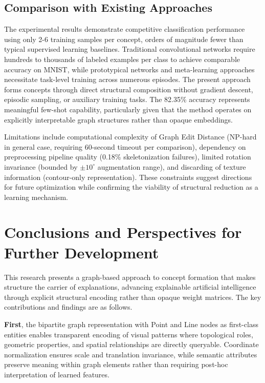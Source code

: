 \documentclass[a4paper,10pt]{article}
\begin{document}
\subsection{Comparison with Existing Approaches}

The experimental results demonstrate competitive classification performance using only 2-6 training samples per concept, orders of magnitude fewer than typical supervised learning baselines. Traditional convolutional networks require hundreds to thousands of labeled examples per class to achieve comparable accuracy on MNIST, while prototypical networks and meta-learning approaches necessitate task-level training across numerous episodes. The present approach forms concepts through direct structural composition without gradient descent, episodic sampling, or auxiliary training tasks. The 82.35\% accuracy represents meaningful few-shot capability, particularly given that the method operates on explicitly interpretable graph structures rather than opaque embeddings.

Limitations include computational complexity of Graph Edit Distance (NP-hard in general case, requiring 60-second timeout per comparison), dependency on preprocessing pipeline quality (0.18\% skeletonization failures), limited rotation invariance (bounded by $\pm 10^\circ$ augmentation range), and discarding of texture information (contour-only representation). These constraints suggest directions for future optimization while confirming the viability of structural reduction as a learning mechanism.

\section{Conclusions and Perspectives for Further Development}

This research presents a graph-based approach to concept formation that makes structure the carrier of explanations, advancing explainable artificial intelligence through explicit structural encoding rather than opaque weight matrices. The key contributions and findings are as follows.

\textbf{First}, the bipartite graph representation with Point and Line nodes as first-class entities enables transparent encoding of visual patterns where topological roles, geometric properties, and spatial relationships are directly queryable. Coordinate normalization ensures scale and translation invariance, while semantic attributes preserve meaning within graph elements rather than requiring post-hoc interpretation of learned features.
\end{document}
